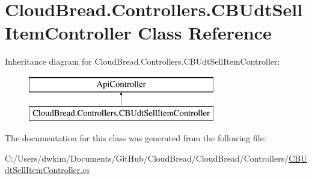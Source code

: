 \hypertarget{class_cloud_bread_1_1_controllers_1_1_c_b_udt_sell_item_controller}{}\section{Cloud\+Bread.\+Controllers.\+C\+B\+Udt\+Sell\+Item\+Controller Class Reference}
\label{class_cloud_bread_1_1_controllers_1_1_c_b_udt_sell_item_controller}
Inheritance diagram for Cloud\+Bread.\+Controllers.\+C\+B\+Udt\+Sell\+Item\+Controller\+:\begin{figure}[H]
\begin{center}
\leavevmode
\includegraphics[height=2.000000cm]{class_cloud_bread_1_1_controllers_1_1_c_b_udt_sell_item_controller}
\end{center}
\end{figure}


The documentation for this class was generated from the following file\+:\begin{DoxyCompactItemize}
\item 
C\+:/\+Users/dwkim/\+Documents/\+Git\+Hub/\+Cloud\+Bread/\+Cloud\+Bread/\+Controllers/\hyperlink{_c_b_udt_sell_item_controller_8cs}{C\+B\+Udt\+Sell\+Item\+Controller.\+cs}\end{DoxyCompactItemize}
